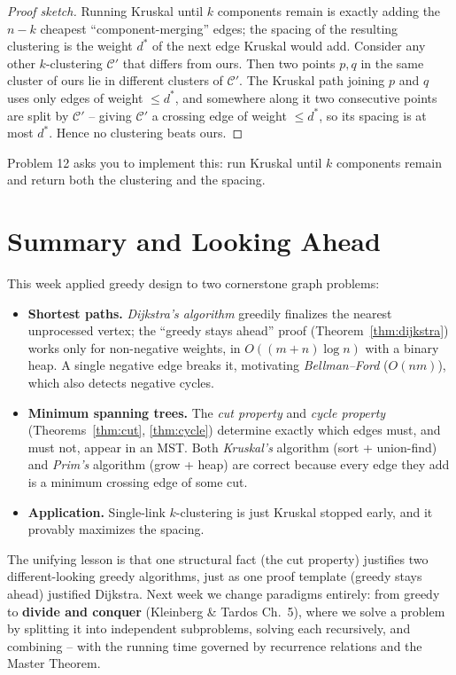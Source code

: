 \documentclass[11pt]{article}
\begin{document}
\begin{proof}[Proof sketch]
Running Kruskal until $k$ components remain is exactly adding the $n-k$ cheapest
``component-merging'' edges; the spacing of the resulting clustering is the
weight $d^\ast$ of the next edge Kruskal would add. Consider any other
$k$-clustering $\mathcal{C}'$ that differs from ours. Then two points $p, q$ in
the same cluster of ours lie in different clusters of $\mathcal{C}'$. The Kruskal
path joining $p$ and $q$ uses only edges of weight $\le d^\ast$, and somewhere
along it two consecutive points are split by $\mathcal{C}'$ -- giving
$\mathcal{C}'$ a crossing edge of weight $\le d^\ast$, so its spacing is at most
$d^\ast$. Hence no clustering beats ours.
\end{proof}

Problem 12 asks you to implement this: run Kruskal until $k$ components remain
and return both the clustering and the spacing.

\section{Summary and Looking Ahead}

This week applied greedy design to two cornerstone graph problems:

\begin{itemize}
    \item \textbf{Shortest paths.} \emph{Dijkstra's algorithm} greedily
    finalizes the nearest unprocessed vertex; the ``greedy stays ahead'' proof
    (Theorem~\ref{thm:dijkstra}) works only for non-negative weights, in
    $O((m+n)\log n)$ with a binary heap. A single negative edge breaks it,
    motivating \emph{Bellman--Ford} ($O(nm)$), which also detects negative
    cycles.
    \item \textbf{Minimum spanning trees.} The \emph{cut property} and
    \emph{cycle property} (Theorems~\ref{thm:cut}, \ref{thm:cycle}) determine
    exactly which edges must, and must not, appear in an MST. Both
    \emph{Kruskal's} algorithm (sort + union-find) and \emph{Prim's} algorithm
    (grow + heap) are correct because every edge they add is a minimum crossing
    edge of some cut.
    \item \textbf{Application.} Single-link $k$-clustering is just Kruskal
    stopped early, and it provably maximizes the spacing.
\end{itemize}

The unifying lesson is that one structural fact (the cut property) justifies two
different-looking greedy algorithms, just as one proof template (greedy stays
ahead) justified Dijkstra. Next week we change paradigms entirely: from greedy
to \textbf{divide and conquer} (Kleinberg \& Tardos Ch.\ 5), where we solve a
problem by splitting it into independent subproblems, solving each recursively,
and combining -- with the running time governed by recurrence relations and the
Master Theorem.
\end{document}
